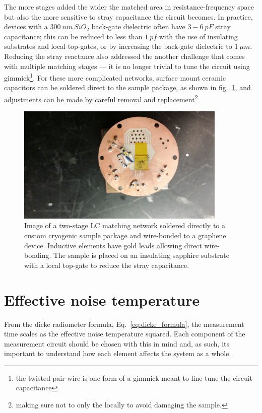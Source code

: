 The more stages added the wider the matched area in resistance-frequency space but also the more sensitive to stray capacitance the circuit becomes. In practice, devices with a $300~nm~SiO_2$ back-gate dielectric often have $3-6~pF$ stray capacitance; this can be reduced to less than $1~pf$ with the use of insulating substrates and local top-gates, or by increasing the back-gate dielectric to $1~\mu m$. Reducing the stray reactance also addressed the another challenge that comes with multiple matching stages --- it is no longer trivial to tune the circuit using gimmick\footnote{the twisted pair wire is one form of a gimmick meant to fine tune the circuit capacitance}. For these more complicated networks, surface mount ceramic capacitors can be soldered direct to the sample package, as shown in fig.~\ref{fig:picture_doubleLC}, and adjustments can be made by careful removal and replacement\footnote{making sure not to only the locally to avoid damaging the sample.}
\begin{figure}
\centering
\includegraphics[width = 100mm]{figures/Johnson_noise_thermometry/picture_matching_ceramic}
\caption{Image of a two-stage LC matching network soldered directly to a custom cryogenic sample package and wire-bonded to a graphene device. Inductive elements have gold leads allowing direct wire-bonding. The sample is placed on an insulating sapphire substrate with a local top-gate to reduce the stray capacitance.}
\label{fig:picture_doubleLC}
\end{figure}

\section{Effective noise temperature}
 From the dicke radiometer formula, Eq.~\ref{eq:dicke_formula}, the measurement time scales as the effective noise temperature squared. Each component of the measurement circuit should be chosen with this in mind and, as such, its important to understand how each element affects the system as a whole.

